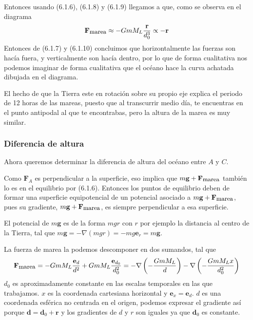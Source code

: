 Entonces usando (6.1.6), (6.1.8) y (6.1.9) llegamos a que, como se observa en el diagrama
\begin{equation} \label{6.1.1}
    \mathbf{F}_{\mbox{\small marea}}\approx-GmM_L\frac{\mathbf{r}}{d_0^3} \propto -\mathbf{r}
\end{equation} 
Entonces de (6.1.7) y (6.1.10) concluimos que horizontalmente las fuerzas son hacía fuera, y verticalmente son hacía dentro, por lo que de forma cualitativa nos podemos imaginar de forma cualitativa que el océano hace la curva achatada dibujada en el diagrama.

El hecho de que la Tierra este en rotación sobre su propio eje explica el periodo de 12 horas de las mareas, puesto que al transcurrir medio día, te encuentras en el punto antipodal al que te encontrabas, pero la altura de la marea es muy similar.

\subsubsection{Diferencia de altura}
Ahora queremos determinar la diferencia de altura del océano entre $A$ y $C$.

Como $\mathbf{F}_A$ es perpendicular a la superficie, eso implica que $m\mathbf{g}+\mathbf{F}_{\mbox{\small marea}}$ también lo es en el equilibrio por (6.1.6). Entonces los puntos de equilibrio deben de formar una superficie equipotencial de un potencial asociado a $m\mathbf{g}+\mathbf{F}_{\mbox{\small marea}}$, pues su gradiente, $m\mathbf{g}+\mathbf{F}_{\mbox{\small marea}}$, es siempre perpendicular a esa superficie.

El potencial de $m\mathbf{g}$ es de la forma $mgr$ con $r$ por ejemplo la distancia al centro de la Tierra, tal que $m\mathbf{g}=-\nabla(mgr)=-mg\mathbf{e}_r=m\mathbf{g}$.

La fuerza de marea la podemos descomponer en dos sumandos, tal que
\begin{equation} \label{6.1.1}
    \mathbf{F}_{\mbox{\small marea}}= -GmM_L\frac{\mathbf{e}_d}{d^2}+GmM_L\frac{\mathbf{e}_{d_0}}{d_0^2}=-\nabla\left(-\frac{GmM_L}{d}\right)-\nabla\left(-\frac{GmM_Lx}{d_0^2}\right)
\end{equation} 
$d_0$ es aproximadamente constante en las escalas temporales en las que trabajamos. $x$ es la coordenada cartesiana horizontal y $\mathbf{e}_x=\mathbf{e}_d$. $d$ es una coordenada esférica no centrada en el origen, podemos expresar el gradiente así porque $\mathbf{d}=\mathbf{d}_0+\mathbf{r}$ y los gradientes de $d$ y $r$ son iguales ya que $\mathbf{d}_0$ es constante.

